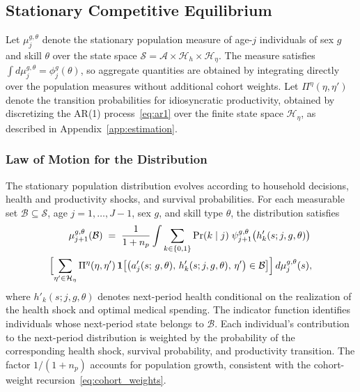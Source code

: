 \documentclass[12pt,a4paper]{article}
\begin{document}
\subsection{Stationary Competitive Equilibrium}
\label{subsec:equilibrium}

Let $\mu_j^{g,\theta}$ denote the stationary population measure of age-$j$ individuals of sex $g$ and skill $\theta$ over the state space $\mathcal{S} = \mathcal{A} \times \mathcal{H}_h \times \mathcal{H}_\eta$. The measure satisfies $\int d\mu_j^{g,\theta} = \phi_j^{g}(\theta)$, so aggregate quantities are obtained by integrating directly over the population measures without additional cohort weights. Let $\Pi^\eta(\eta,\eta')$ denote the transition probabilities for idiosyncratic productivity, obtained by discretizing the AR(1) process~\eqref{eq:ar1} over the finite state space $\mathcal{H}_\eta$, as described in Appendix~\ref{app:estimation}.


\subsubsection{Law of Motion for the Distribution}

The stationary population distribution evolves according to household decisions, health and productivity shocks, and survival probabilities. For each measurable set $\mathcal{B} \subseteq \mathcal{S}$, age $j = 1,\ldots,J-1$, sex $g$, and skill type $\theta$, the distribution satisfies
\begin{equation}
\label{eq:lom}
\begin{split}
\mu_{j+1}^{g,\theta}(\mathcal{B})
\;=\;
\frac{1}{1 + n_p}
\int
\sum_{k \in \{0,1\}} \Pr(k \mid j)\;
\psi_{j+1}^{g,\theta}\bigl(h'_k(s; j, g, \theta)\bigr)\,\\
\Bigl[\sum_{\eta' \in \mathcal{H}_\eta}
\Pi^\eta(\eta, \eta')\,
\mathbf{1}\bigl[\bigl(a_j'(s;\, g, \theta),\, h'_k(s; j, g, \theta),\, \eta'\bigr) \in \mathcal{B}\bigr]
\Bigr]
\, d\mu_j^{g,\theta}(s),
\end{split}
\end{equation}
where $h'_k(s; j, g, \theta)$ denotes next-period health conditional on the realization of the health shock and optimal medical spending. The indicator function identifies individuals whose next-period state belongs to $\mathcal{B}$. Each individual's contribution to the next-period distribution is weighted by the probability of the corresponding health shock, survival probability, and productivity transition. The factor $1/(1+n_p)$ accounts for population growth, consistent with the cohort-weight recursion~\eqref{eq:cohort_weights}.
\end{document}
